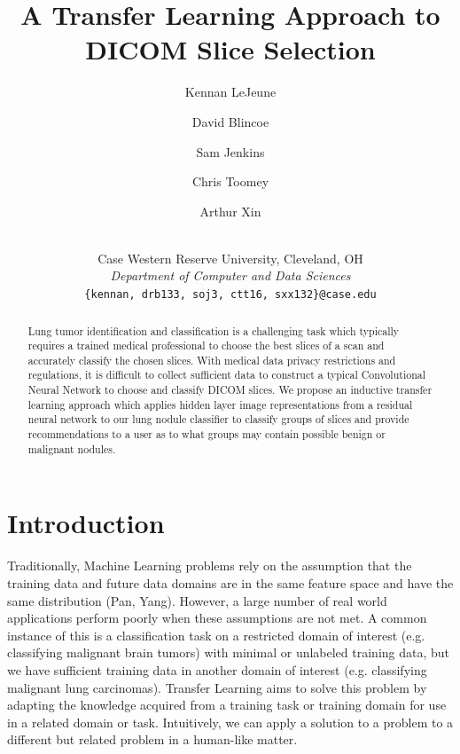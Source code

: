 \documentclass[10pt,twocolumn,letterpaper]{article}
\begin{document}
\title{A Transfer Learning Approach to DICOM Slice Selection}

\author{Kennan LeJeune\\
   \and
   David Blincoe\\
   \and
   Sam Jenkins\\
   \and
   Chris Toomey\\
   \and
   Arthur Xin\\
   \and
   \\
   {Case Western Reserve University, Cleveland, OH}\\
   {\textit{Department of Computer and Data Sciences}}\\
   {\tt\small \{kennan, drb133, soj3, ctt16, sxx132\}@case.edu}
}
\maketitle

\begin{abstract}
   Lung tumor identification and classification is a challenging task which typically requires a trained medical
   professional to choose the best slices of a scan and accurately classify the chosen slices. With medical data privacy restrictions
   and regulations, it is difficult to collect sufficient data to construct a typical Convolutional Neural Network to
   choose and classify DICOM slices. We propose an inductive transfer learning approach which applies hidden layer
   image representations from a residual neural network to our lung nodule classifier to classify groups of slices and provide
   recommendations to a user as to what groups may contain possible benign or malignant nodules.
\end{abstract}

\section{Introduction} \label{sec:intro}

   Traditionally, Machine Learning problems rely on the assumption that the training data and future data domains
   are in the same feature space and have the same distribution (Pan, Yang). However, a large number of real world
   applications perform poorly when these assumptions are not met. A common instance of this is a classification task on
   a restricted domain of interest (e.g. classifying malignant brain tumors) with minimal or unlabeled training data,
   but we have sufficient training data in another domain of interest (e.g. classifying malignant lung carcinomas).
   Transfer Learning aims to solve this problem by adapting the knowledge acquired from a training task or
   training domain for use in a related domain or task. Intuitively, we can apply a solution to a problem to a
   different but related problem in a human-like matter.
\end{document}
